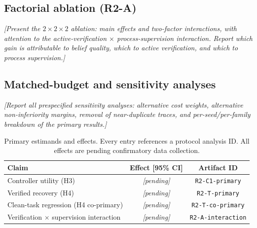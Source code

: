 \subsection{Factorial ablation (R2-A)}

\textit{[Present the $2 \times 2 \times 2$ ablation: main effects and
two-factor interactions, with attention to the active-verification
$\times$ process-supervision interaction. Report which gain is
attributable to belief quality, which to active verification, and which
to process supervision.]}

\subsection{Matched-budget and sensitivity analyses}

\textit{[Report all prespecified sensitivity analyses: alternative cost
weights, alternative non-inferiority margins, removal of near-duplicate
traces, and per-seed/per-family breakdown of the primary results.]}

\begin{table}[t]
\centering
\caption{Primary estimands and effects. Every entry references a protocol
analysis ID. All effects are pending confirmatory data collection.}
\label{tab:primary_effects}
\begin{tabular}{lcc}
\toprule
\textbf{Claim} & \textbf{Effect [95\% CI]} & \textbf{Artifact ID} \\
\midrule
Controller utility (H3) & \textit{[pending]} &
  \texttt{R2-C1-primary} \\
Verified recovery (H4) & \textit{[pending]} &
  \texttt{R2-T-primary} \\
Clean-task regression (H4 co-primary) & \textit{[pending]} &
  \texttt{R2-T-co-primary} \\
Verification $\times$ supervision interaction & \textit{[pending]} &
  \texttt{R2-A-interaction} \\
\bottomrule
\end{tabular}
\end{table}
